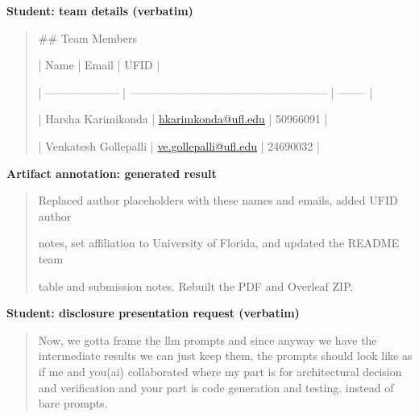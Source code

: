 \par\medskip\noindent\textbf{Student: team details (verbatim)}\par

\begin{quote}\small\raggedright

\#\# Team Members\par

| Name                 | Email                                                 | UFID     |\par
| -------------------- | ----------------------------------------------------- | -------- |\par
| Harsha Karimikonda   | \href{mailto:hkarimkonda@ufl.edu}{hkarimkonda@ufl.edu}     | 50966091 |\par
| Venkatesh Gollepalli | \href{mailto:ve.gollepalli@ufl.edu}{ve.gollepalli@ufl.edu} | 24690032 |\par

\end{quote}

\par\medskip\noindent\textbf{Artifact annotation: generated result}\par

\begin{quote}\small\raggedright

Replaced author placeholders with these names and emails, added UFID author\par
notes, set affiliation to University of Florida, and updated the README team\par
table and submission notes. Rebuilt the PDF and Overleaf ZIP.\par

\end{quote}

\par\medskip\noindent\textbf{Student: disclosure presentation request (verbatim)}\par

\begin{quote}\small\raggedright

Now, we gotta frame the llm prompts and since anyway we have the intermediate results we can just keep them, the prompts should look like as if me and you(ai) collaborated where my part is for architectural decision and verification and your part is code generation and testing. instead of bare prompts.\par

\end{quote}

